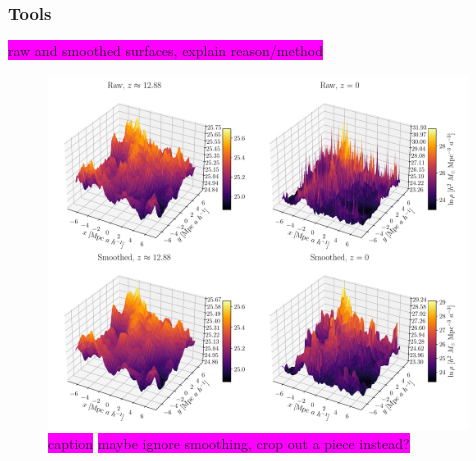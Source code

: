 \documentclass[aps,pra,english,notitlepage,reprint,nofootinbib]{revtex4-1}  %
\begin{document}
\subsubsection{Tools}\label{subsubsec:tools}




\colorbox{magenta}{raw and smoothed surfaces, explain reason/method}

\begin{figure}
  \vspace*{-5pt}
  \centering %
  \includegraphics[width=0.99\textwidth]{../figs/density_surf_all.pdf}
  \caption{\colorbox{magenta}{caption} \colorbox{magenta}{maybe ignore smoothing, crop out a piece instead?}}\label{fig:density surf}
  \vspace*{-5pt}
\end{figure}
\end{document}
